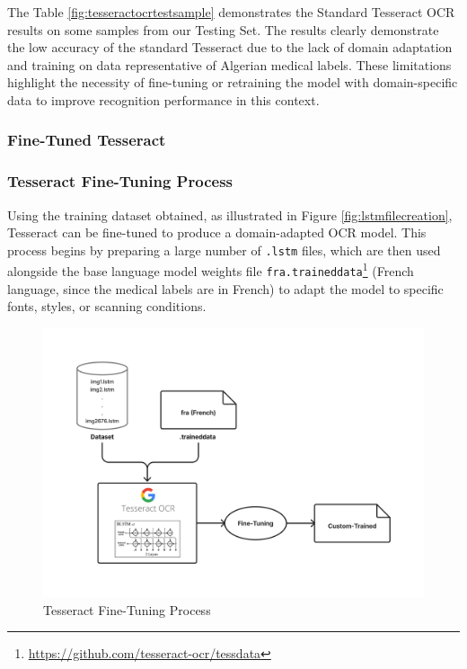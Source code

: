 The Table \ref{fig:tesseractocrtestsample} demonstrates the Standard Tesseract OCR results on some samples from our Testing Set. The results clearly demonstrate the low accuracy of the standard Tesseract due to the lack of domain adaptation and training on data representative of Algerian medical labels. These limitations highlight the necessity of fine-tuning or retraining the model with domain-specific data to improve recognition performance in this context.
 

\subsubsection{Fine-Tuned Tesseract}

\subsubsection*{Tesseract Fine-Tuning Process}

Using the training dataset obtained, as illustrated in Figure \ref{fig:lstmfilecreation}, Tesseract can be fine-tuned to produce a domain-adapted OCR model. This process begins by preparing a large number of \texttt{.lstm} files, which are then used alongside the base language model weights file \texttt{fra.traineddata}\footnote{\url{https://github.com/tesseract-ocr/tessdata}} (French language, since the medical labels are in French) to adapt the model to specific fonts, styles, or scanning conditions.

\begin{figure}[H]
\centering
\includegraphics[width=\textwidth]{Figures/Chapter 3/Tesseract_Fine_Tuning_Process.png}
\caption{Tesseract Fine-Tuning Process}
\label{fig:tesseractfinetuning}
\end{figure}

